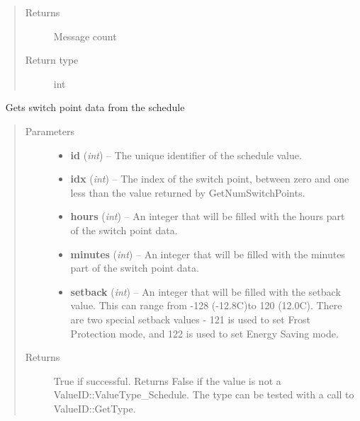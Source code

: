\documentclass[letterpaper,10pt,english]{sphinxmanual}
\begin{document}
\begin{fulllineitems}
\begin{fulllineitems}
\begin{quote}
\begin{description}
\item[{Returns}] \leavevmode
Message count

\item[{Return type}] \leavevmode
int

\end{description}\end{quote}

\end{fulllineitems}


\begin{fulllineitems}
\label{libopenzwave:libopenzwave.PyManager.getSwitchPoint}~\label{libopenzwave:getswitchpoint}
Gets switch point data from the schedule
\begin{quote}\begin{description}
\item[{Parameters}] \leavevmode\begin{itemize}
\item {} 
\textbf{id} (\emph{int}) -- The unique identifier of the schedule value.

\item {} 
\textbf{idx} (\emph{int}) -- The index of the switch point, between zero and one less than the value returned by GetNumSwitchPoints.

\item {} 
\textbf{hours} (\emph{int}) -- An integer that will be filled with the hours part of the switch point data.

\item {} 
\textbf{minutes} (\emph{int}) -- An integer that will be filled with the minutes part of the switch point data.

\item {} 
\textbf{setback} (\emph{int}) -- An integer that will be filled with the setback value.  This can range from -128 (-12.8C)to 120 (12.0C).  There are two special setback values - 121 is used to set Frost Protection mode, and 122 is used to set Energy Saving mode.

\end{itemize}

\item[{Returns}] \leavevmode
True if successful.  Returns False if the value is not a ValueID::ValueType\_Schedule. The type can be tested with a call to ValueID::GetType.


\end{description}
\end{quote}
\end{fulllineitems}
\end{fulllineitems}
\end{document}
